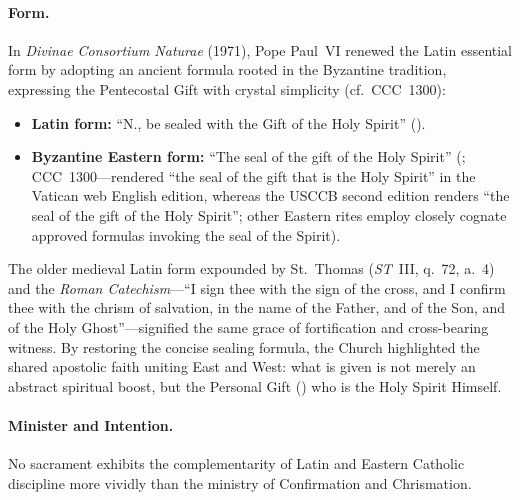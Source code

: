 \paragraph{Form.}
In \emph{Divinae Consortium Naturae} (1971), Pope Paul~VI renewed the Latin essential form by adopting an ancient formula rooted in the Byzantine tradition, expressing the Pentecostal Gift with crystal simplicity (cf.~CCC~1300):
\begin{itemize}
  \item \textbf{Latin form:} ``N., be sealed with the Gift of the Holy Spirit'' ().
  \item \textbf{Byzantine Eastern form:} ``The seal of the gift of the Holy Spirit'' (; CCC~1300---rendered ``the seal of the gift that is the Holy Spirit'' in the Vatican web English edition, whereas the USCCB second edition renders ``the seal of the gift of the Holy Spirit''; other Eastern rites employ closely cognate approved formulas invoking the seal of the Spirit).
\end{itemize}
The older medieval Latin form expounded by St.~Thomas (\emph{ST}~III, q.~72, a.~4) and the \emph{Roman Catechism}---``I sign thee with the sign of the cross, and I confirm thee with the chrism of salvation, in the name of the Father, and of the Son, and of the Holy Ghost''---signified the same grace of fortification and cross-bearing witness. By restoring the concise sealing formula, the Church highlighted the shared apostolic faith uniting East and West: what is given is not merely an abstract spiritual boost, but the Personal Gift () who is the Holy Spirit Himself.

\paragraph{Minister and Intention.}
No sacrament exhibits the complementarity of Latin and Eastern Catholic discipline more vividly than the ministry of Confirmation and Chrismation.

